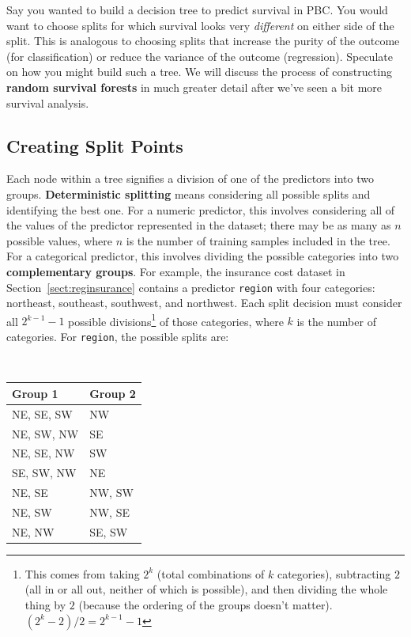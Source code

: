 \begin{question}{}
Say you wanted to build a decision tree to predict survival in PBC. You would want to choose splits for which survival looks very \emph{different} on either side of the split. This is analogous to choosing splits that increase the purity of the outcome (for classification) or reduce the variance of the outcome (regression). Speculate on how you might build such a tree. We will discuss the process of constructing \textbf{random survival forests} in much greater detail after we've seen a bit more survival analysis. 
\end{question}

\subsection{Creating Split Points}

Each node within a tree signifies a division of one of the predictors into two groups. \textbf{Deterministic splitting} means considering all possible splits and identifying the best one. For a numeric predictor, this involves considering all of the values of the predictor represented in the dataset; there may be as many as $n$ possible values, where $n$ is the number of training samples included in the tree. For a categorical predictor, this involves dividing the possible categories into two \textbf{complementary groups}. For example, the insurance cost dataset in Section~\ref{sect:reginsurance} contains a predictor \texttt{region} with four categories: northeast, southeast, southwest, and northwest. Each split decision must consider all $2^{k-1}-1$ possible divisions\footnote{This comes from taking $2^k$ (total combinations of $k$ categories), subtracting $2$ (all in or all out, neither of which is possible), and then dividing the whole thing by $2$ (because the ordering of the groups doesn't matter). $(2^k - 2)/2 = 2^{k-1}-1$} of those categories, where $k$ is the number of categories. For \texttt{region}, the possible splits are:

\begin{center}
{\small \tt
\begin{tabular}{ll}
Group 1 & Group 2 \\
\midrule
NE, SE, SW & NW \\
NE, SW, NW & SE \\
NE, SE, NW & SW \\
SE, SW, NW & NE \\
NE, SE & NW, SW \\
NE, SW & NW, SE \\
NE, NW & SE, SW \\
\end{tabular}
}
\end{center}

